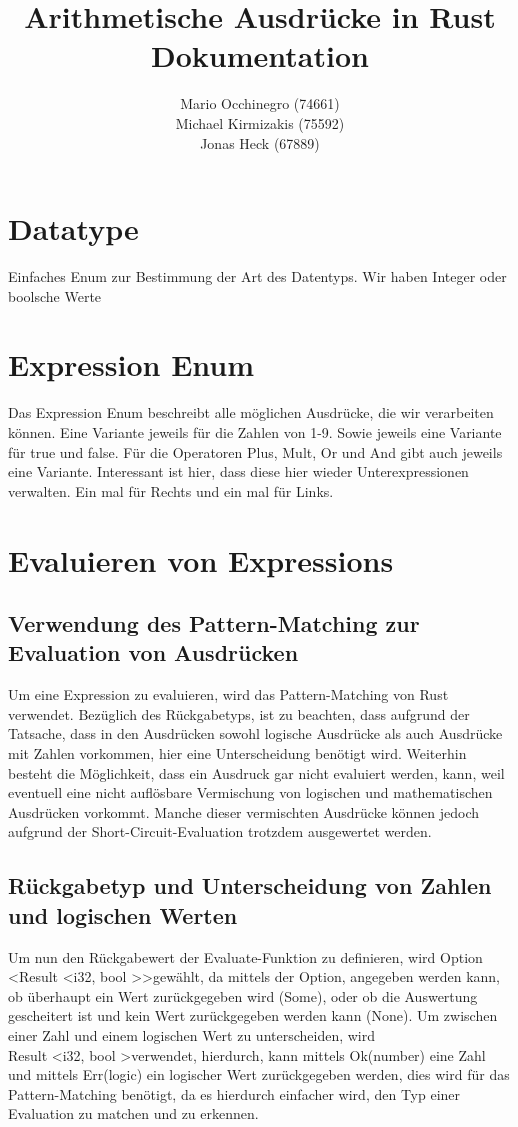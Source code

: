 \documentclass[a4paper, 1ppt]{article}
\title{Arithmetische Ausdrücke in Rust Dokumentation}
\date{}
\author{
		Mario Occhinegro (74661)\\
		Michael Kirmizakis (75592)\\
		Jonas Heck (67889)
}
\begin{document}
\nocite{*}
\maketitle
\newpage
\clearpage
\tableofcontents
\setcounter{page}{1}
\newpage
{}
\maketitle
\section{Datatype}
Einfaches Enum zur Bestimmung der Art des Datentyps.
Wir haben Integer oder boolsche Werte
\section{Expression Enum}
Das Expression Enum beschreibt alle möglichen Ausdrücke, die wir verarbeiten können.
Eine Variante jeweils für die Zahlen von 1-9. Sowie jeweils eine Variante für true und false.
Für die Operatoren Plus, Mult, Or und And gibt auch jeweils eine Variante. Interessant ist hier, dass 
diese hier wieder Unterexpressionen verwalten. Ein mal für Rechts und ein mal für Links.
\section{Evaluieren von Expressions}
\subsection{Verwendung des Pattern-Matching zur Evaluation von Ausdrücken}
Um eine Expression zu evaluieren, wird das Pattern-Matching von Rust verwendet. Bezüglich des Rückgabetyps, ist zu beachten, dass aufgrund der Tatsache, dass in den Ausdrücken sowohl logische Ausdrücke als auch Ausdrücke mit Zahlen vorkommen, hier eine Unterscheidung benötigt wird. Weiterhin besteht die Möglichkeit, dass ein Ausdruck gar nicht evaluiert werden, kann, weil eventuell eine nicht auflösbare Vermischung von logischen und mathematischen Ausdrücken vorkommt. Manche dieser vermischten Ausdrücke können jedoch aufgrund der Short-Circuit-Evaluation trotzdem ausgewertet werden.
\subsection{Rückgabetyp und Unterscheidung von Zahlen und logischen Werten}
Um nun den Rückgabewert der Evaluate-Funktion zu definieren, wird Option \textless Result \textless i32, bool \textgreater  \textgreater  gewählt, da mittels der Option, angegeben werden kann, ob überhaupt ein Wert zurückgegeben wird (Some), oder ob die Auswertung gescheitert ist und kein Wert zurückgegeben werden kann (None). Um zwischen einer Zahl und einem logischen Wert zu unterscheiden, wird
\\Result \textless i32, bool \textgreater  verwendet, hierdurch, kann mittels Ok(number) eine Zahl und mittels Err(logic) ein logischer Wert zurückgegeben werden, dies wird für das Pattern-Matching benötigt, da es hierdurch einfacher wird, den Typ einer Evaluation zu matchen und zu erkennen.
\end{document}
